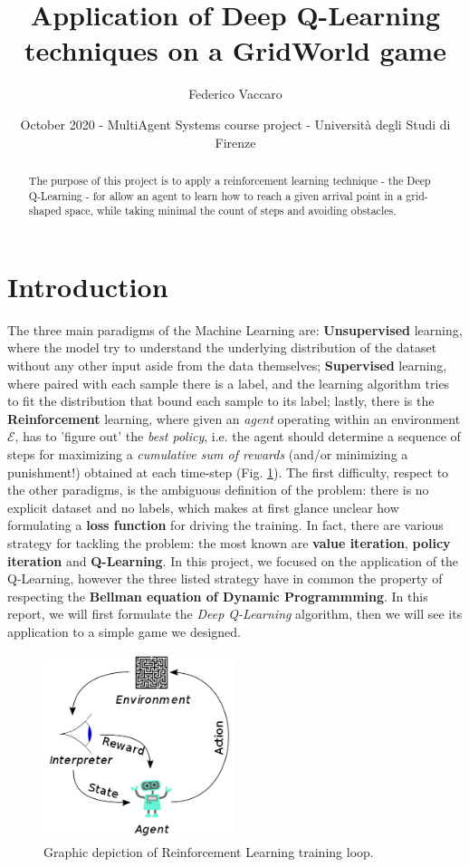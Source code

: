 \documentclass{article}
\title{Application of Deep Q-Learning techniques on a GridWorld game}
\date{October 2020 - MultiAgent Systems course project - Università degli Studi di Firenze}
\author{Federico Vaccaro}
\begin{document}
\maketitle

\begin{abstract}
	The purpose of this project is to apply a reinforcement learning technique - the Deep Q-Learning - for allow an agent to learn how to reach a given arrival point in a grid-shaped space, while taking minimal the count of steps and avoiding obstacles.
\end{abstract}


\section{Introduction}

The three main paradigms of the Machine Learning are: \textbf{Unsupervised} learning, where the model try to understand the underlying distribution of the dataset without any other input aside from the data themselves; \textbf{Supervised} learning, where paired with each sample there is a label, and the learning algorithm tries to fit the distribution that bound each sample to its label; lastly, there is the \textbf{Reinforcement} learning, where given an \textit{agent} operating within an environment $\mathcal{E}
$, has to 'figure out' the \textit{best policy}, i.e. the agent should determine a sequence of steps for maximizing a \textit{cumulative sum of rewards} (and/or minimizing a punishment!) obtained at each time-step (Fig. \ref{fig:rl}). The first difficulty, respect to the other paradigms, is the ambiguous definition of the problem: there is no explicit dataset and no labels, which makes at first glance unclear how formulating a \textbf{loss function} for driving the training. In fact, there are various strategy for tackling the problem: the most known are \textbf{value iteration}, \textbf{policy iteration} and \textbf{Q-Learning}. In this project, we focused on the application of the Q-Learning, however the three listed strategy have in common the property of respecting the \textbf{Bellman equation of Dynamic Programmming}. In this report, we will first formulate the \textit{Deep Q-Learning} algorithm, then we will see its application to a simple game we designed.

\begin{figure}[H]
	\centering
	\includegraphics[width=0.5\textwidth]{reinforcement}
	\caption{Graphic depiction of Reinforcement Learning training loop.}
	\label{fig:rl}
\end{figure}
\end{document}
